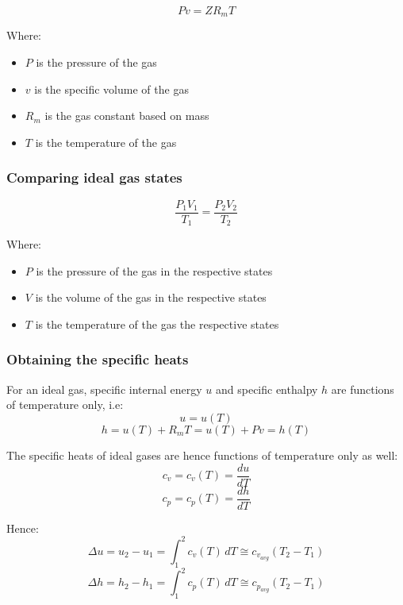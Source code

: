 \documentclass[11pt]{article}
\begin{document}
\[Pv = ZR_mT\]

Where:
\begin{itemize}
\item \(P\) is the pressure of the gas
\item \(v\) is the specific volume of the gas
\item \(R_m\) is the gas constant based on mass
\item \(T\) is the temperature of the gas
\end{itemize}

\subsubsection{Comparing ideal gas states}
\label{sec:orgf593f59}
\[\frac{P_1 V_1}{T_1} = \frac{P_2 V_2}{T_2}\]

Where:
\begin{itemize}
\item \(P\) is the pressure of the gas in the respective states
\item \(V\) is the volume of the gas in the respective states
\item \(T\) is the temperature of the gas the respective states
\end{itemize}

\subsubsection{Obtaining the specific heats}
\label{sec:orgda3dbcd}
For an ideal gas, specific internal energy \(u\) and specific enthalpy \(h\) are functions of temperature only, i.e:
\[u = u(T)\]
\[h = u(T) + R_mT = u(T) + Pv = h(T)\]

The specific heats of ideal gases are hence functions of temperature only as well:
\[c_v = c_v(T) = \frac{du}{dT}\]
\[c_p = c_p(T) = \frac{dh}{dT}\]

Hence:
\[\Delta u = u_2 - u_1 = \int_1^2 c_v(T) \, dT \cong c_{v_{avg}} \left(T_2 - T_1 \right)\]
\[\Delta h = h_2 - h_1 = \int_1^2 c_p(T) \, dT \cong c_{p_{avg}} \left(T_2 - T_1 \right)\]
\end{document}
